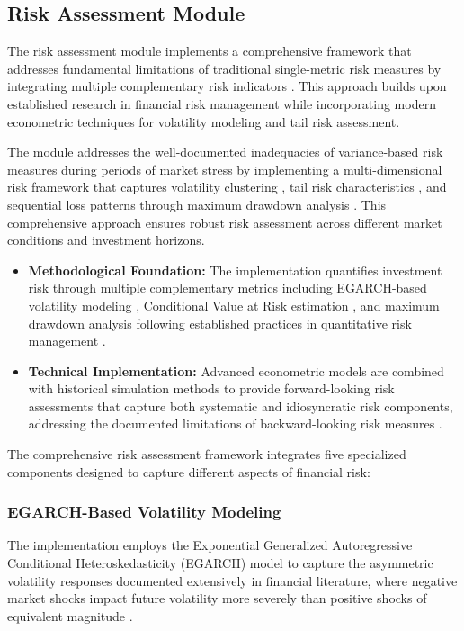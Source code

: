 \documentclass[3p,times,procedia]{elsarticle}
\begin{document}
\subsection{{Risk Assessment Module}}

The risk assessment module implements a comprehensive framework that addresses fundamental limitations of traditional single-metric risk measures by integrating multiple complementary risk indicators \cite{Jorion2001,Rockafellar2000}. This approach builds upon established research in financial risk management while incorporating modern econometric techniques for volatility modeling and tail risk assessment.

The module addresses the well-documented inadequacies of variance-based risk measures during periods of market stress by implementing a multi-dimensional risk framework that captures volatility clustering \cite{Engle1982}, tail risk characteristics \cite{Rockafellar2000}, and sequential loss patterns through maximum drawdown analysis \cite{Jorion2001}. This comprehensive approach ensures robust risk assessment across different market conditions and investment horizons.

\begin{itemize}
    \item \textbf{Methodological Foundation:} The implementation quantifies investment risk through multiple complementary metrics including EGARCH-based volatility modeling \cite{Nelson1991}, Conditional Value at Risk estimation \cite{Rockafellar2000}, and maximum drawdown analysis following established practices in quantitative risk management \cite{Jorion2001}.
    \item \textbf{Technical Implementation:} Advanced econometric models are combined with historical simulation methods to provide forward-looking risk assessments that capture both systematic and idiosyncratic risk components, addressing the documented limitations of backward-looking risk measures \cite{Campbell2001}.
\end{itemize}

The comprehensive risk assessment framework integrates five specialized components designed to capture different aspects of financial risk:

\subsubsection{{EGARCH-Based Volatility Modeling}}

The implementation employs the Exponential Generalized Autoregressive Conditional Heteroskedasticity (EGARCH) model \cite{Nelson1991} to capture the asymmetric volatility responses documented extensively in financial literature, where negative market shocks impact future volatility more severely than positive shocks of equivalent magnitude \cite{Black1976}.
\end{document}
